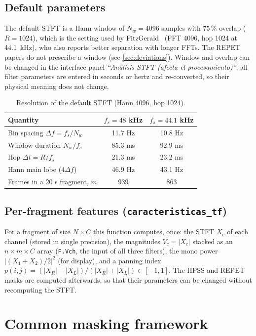 \documentclass[11pt,a4paper]{article}
\newcommand{\code}[1]{\texttt{#1}}
\begin{document}
\subsection{Default parameters}
The default STFT is a Hann window of $N_w=4096$ samples with $75\,\%$
overlap ($R=1024$), which is the setting used by FitzGerald~\cite{fitzgerald2010}
(FFT 4096, hop 1024 at 44.1~kHz), who also reports better separation with
longer FFTs. The REPET papers do not prescribe a window (see
\cref{sec:deviations}). Window and overlap can be changed in the
interface panel \emph{``An\'alisis STFT (afecta el procesamiento)''}; all
filter parameters are entered in seconds or hertz and re-converted, so
their physical meaning does not change.

\begin{table}[htbp]
\centering
\caption{Resolution of the default STFT (Hann 4096, hop 1024).}
\label{tab:stft}
\begin{tabular}{@{}lcc@{}}
\toprule
Quantity & $f_s=48$ kHz & $f_s=44.1$ kHz \\
\midrule
Bin spacing $\Delta f=f_s/N_w$ & 11.7 Hz & 10.8 Hz \\
Window duration $N_w/f_s$ & 85.3 ms & 92.9 ms \\
Hop $\Delta t=R/f_s$ & 21.3 ms & 23.2 ms \\
Hann main lobe ($4\Delta f$) & 46.9 Hz & 43.1 Hz \\
Frames in a 20 s fragment, $m$ & 939 & 863 \\
\bottomrule
\end{tabular}
\end{table}

\subsection{Per-fragment features (\code{caracteristicas\_tf})}
For a fragment of size $N\times C$ this function computes, once:
the STFT $X_c$ of each channel (stored in single precision), the
magnitudes $V_c=|X_c|$ stacked as an $n\times m\times C$ array
(\code{F.Vch}, the input of all three filters), the mono power
$|(X_1+X_2)/2|^2$ (for display), and a panning index
$p(i,j)=(|X_R|-|X_L|)/(|X_R|+|X_L|)\in[-1,1]$. The HPSS and REPET masks are
computed afterwards, so that their parameters can be changed without
recomputing the STFT.

\section{Common masking framework}
\label{sec:combination}
\end{document}
